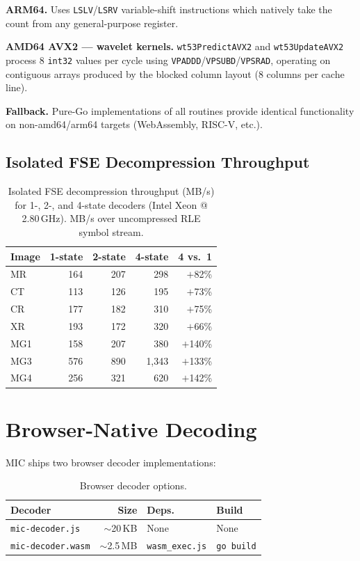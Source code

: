 \documentclass[10pt,twocolumn]{article}
\begin{document}
\textbf{ARM64.} Uses \texttt{LSLV}/\texttt{LSRV} variable-shift instructions
which natively take the count from any general-purpose register.

\textbf{AMD64 AVX2 --- wavelet kernels.} \texttt{wt53PredictAVX2} and
\texttt{wt53UpdateAVX2} process 8 \texttt{int32} values per cycle using
\texttt{VPADDD}/\texttt{VPSUBD}/\texttt{VPSRAD}, operating on contiguous arrays
produced by the blocked column layout (8 columns per cache line).

\textbf{Fallback.} Pure-Go implementations of all routines provide identical
functionality on non-amd64/arm64 targets (WebAssembly, RISC-V, etc.).

\subsection{Isolated FSE Decompression Throughput}

\begin{table}[htbp]
\centering
\footnotesize
\setlength{\tabcolsep}{4pt}
\caption{Isolated FSE decompression throughput (MB/s) for 1-, 2-, and 4-state
decoders (Intel Xeon @ 2.80\,GHz). MB/s over uncompressed RLE symbol stream.}
\label{tab:fse-throughput}
\begin{tabular}{lrrrr}
\toprule
Image & 1-state & 2-state & 4-state & 4 vs.\ 1 \\
\midrule
MR  & 164 & 207 & 298  & $+$82\%  \\
CT  & 113 & 126 & 195  & $+$73\%  \\
CR  & 177 & 182 & 310  & $+$75\%  \\
XR  & 193 & 172 & 320  & $+$66\%  \\
MG1 & 158 & 207 & 380  & $+$140\% \\
MG3 & 576 & 890 & 1,343 & $+$133\% \\
MG4 & 256 & 321 & 620  & $+$142\% \\
\bottomrule
\end{tabular}
\end{table}

\section{Browser-Native Decoding}
\label{sec:browser}

MIC ships two browser decoder implementations:

\begin{table}[htbp]
\centering
\footnotesize
\setlength{\tabcolsep}{4pt}
\caption{Browser decoder options.}
\label{tab:browser-decoders}
\setlength{\tabcolsep}{2pt}
\begin{tabular}{p{2.8cm}rll}
\toprule
Decoder & Size & Deps. & Build \\
\midrule
\texttt{mic-decoder.js} & $\sim$20\,KB & None & None \\
\texttt{mic-decoder.wasm} & $\sim$2.5\,MB & \texttt{wasm\_exec.js} & \texttt{go build} \\
\bottomrule
\end{tabular}
\end{table}
\end{document}
